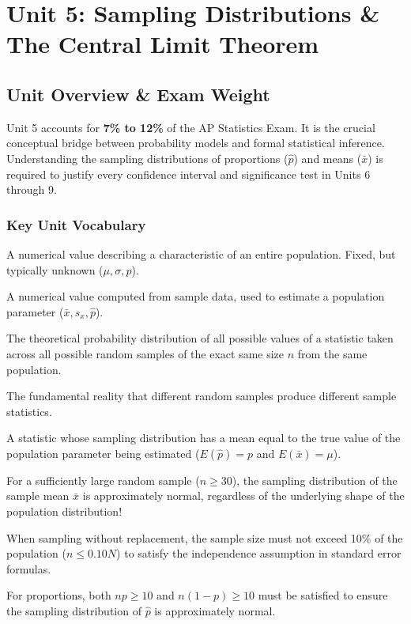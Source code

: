﻿%
\chapter{Unit 5: Sampling Distributions \& The Central Limit Theorem}

\section{Unit Overview \& Exam Weight}
Unit 5 accounts for \textbf{7\% to 12\%} of the AP Statistics Exam. It is the crucial conceptual bridge between probability models and formal statistical inference. Understanding the sampling distributions of proportions ($\hat{p}$) and means ($\bar{x}$) is required to justify every confidence interval and significance test in Units 6 through 9.

\subsection*{Key Unit Vocabulary}
\begin{description}[leftmargin=1.5em, style=nextline]
  \item[Parameter:] A numerical value describing a characteristic of an entire population. Fixed, but typically unknown ($\mu, \sigma, p$).
  \item[Statistic:] A numerical value computed from sample data, used to estimate a population parameter ($\bar{x}, s_x, \hat{p}$).
  \item[Sampling Distribution:] The theoretical probability distribution of all possible values of a statistic taken across all possible random samples of the exact same size $n$ from the same population.
  \item[Sampling Variability:] The fundamental reality that different random samples produce different sample statistics.
  \item[Unbiased Estimator:] A statistic whose sampling distribution has a mean equal to the true value of the population parameter being estimated ($E(\hat{p}) = p$ and $E(\bar{x}) = \mu$).
  \item[Central Limit Theorem (CLT):] For a sufficiently large random sample ($n \ge 30$), the sampling distribution of the sample mean $\bar{x}$ is approximately normal, regardless of the underlying shape of the population distribution!
  \item[10\% Condition:] When sampling without replacement, the sample size must not exceed 10\% of the population ($n \le 0.10N$) to satisfy the independence assumption in standard error formulas.
  \item[Large Counts Condition:] For proportions, both $np \ge 10$ and $n(1-p) \ge 10$ must be satisfied to ensure the sampling distribution of $\hat{p}$ is approximately normal.
\end{description}

